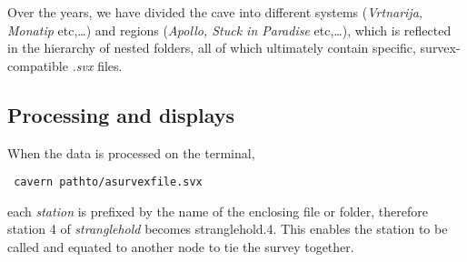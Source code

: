 Over the years, we have divided the cave into different systems (\emph{Vrtnarija, Monatip} etc,…)  and regions (\emph{Apollo, Stuck in Paradise} etc,…), which is reflected in the hierarchy of nested folders, all of which ultimately contain specific, survex-compatible \emph{.svx} files.


 \begin{figure*}[t!]
 \checkoddpage \ifoddpage \forcerectofloat \else \forceversofloat \fi
 \centering
\end{figure*}



\subsection{Processing and displays}
When the data is processed on the terminal,  \begin{verbatim} cavern pathto/asurvexfile.svx \end{verbatim} 

each \emph{station} is prefixed by the name of the enclosing file or folder, therefore station 4 of \emph{stranglehold} becomes stranglehold.4. This enables the station to be called and equated to another node to tie the survey together. 

